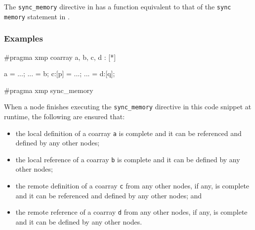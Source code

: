 The {\tt sync\_memory} directive in {\XMPC} has a function equivalent
to that of the {\tt sync memory} statement in {\XMPF}.

\subsubsection*{Examples}

\begin{XCexample}
#pragma xmp coarray a, b, c, d : [*]

a = ...;
... = b;
c:[p] = ...;
... = d:[q];

#pragma xmp sync_memory
\end{XCexample}

\vspace{0.5cm}

When a node finishes executing the {\tt sync\_memory} directive in this
code snippet at runtime, the following are ensured that:

\begin{itemize}
 \item the local definition of a coarray {\tt a} is complete
       and it can be referenced and defined by any other nodes;
 \item the local reference of a coarray {\tt b} is complete
       and it can be defined by any other nodes;
 \item the remote definition of a coarray {\tt c} from any other nodes,
       if any, is complete and it can be referenced and defined by
       any other nodes; and 
 \item the remote reference of a coarray {\tt d} from any other nodes,
       if any, is complete and it can be defined by any other nodes.
\end{itemize}

%


